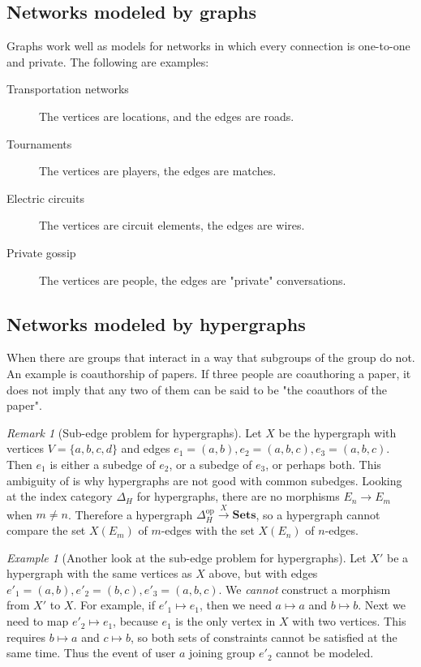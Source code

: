 \documentclass[10pt]{article}
\newcommand{\onearrow}[3]{\mbox{$#1 \stackrel{#2}{\longrightarrow} #3$}}
\newcommand{\mapto}[2]{\mbox{$#1 \mapsto #2$}}
\theoremstyle{remark}
\newtheorem{remark}{Remark}
\newtheorem{example}{Example}
\begin{document}
\subsection{Networks modeled by graphs}

Graphs work well as models for networks in which every connection is one-to-one and private. The following are examples:
\begin{description}
\item [Transportation networks] The vertices are locations, and the edges are roads.
\item [Tournaments] The vertices are players, the edges are matches.
\item [Electric circuits] The vertices are circuit elements, the edges are wires.
\item [Private gossip] The vertices are people, the edges are "private" conversations.
\end{description}

\subsection{Networks modeled by hypergraphs}

When there are groups that interact in a way that subgroups of the group do not. An example is coauthorship of papers. If three people are coauthoring a paper, it does not imply that any two of them can be said to be "the coauthors of the paper".

\begin{remark}[Sub-edge problem for hypergraphs]
Let $X$ be the hypergraph with vertices $V = \{a, b, c, d\}$ and edges $e_1 = (a,b), e_2 = (a,b,c), e_3 = (a,b,c)$.
Then $e_1$ is either a subedge of $e_2$, or a subedge of $e_3$, or perhaps both. This ambiguity of is why hypergraphs are not good with common subedges. Looking at the index category $\Delta_H$ for hypergraphs,
there are no morphisms \onearrow{E_n}{}{E_m} when $m \neq n$. Therefore a hypergraph \onearrow{\Delta_H^{\text{op}}}{X}{\mathbf{Sets}}, so a hypergraph cannot compare the set $X(E_m)$ of $m$-edges with the set $X(E_n)$ of $n$-edges.
\end{remark}

\begin{example}[Another look at the sub-edge problem for hypergraphs]
Let $X'$ be a hypergraph with the same vertices as $X$ above, but with edges $e'_1 = (a,b), e'_2 = (b,c), e'_3 = (a,b,c)$.
We \emph{cannot} construct a morphism from $X'$ to $X$. For example, if \mapto{e'_1}{e_1}, then we need \mapto{a}{a} and \mapto{b}{b}. Next we need to map \mapto{e'_2}{e_1}, because $e_1$ is the only vertex in $X$ with two vertices. This requires \mapto{b}{a} and \mapto{c}{b}, so both sets of constraints cannot be satisfied at the same time.
Thus the event of user $a$ joining group $e'_2$ cannot be modeled.
\end{example}
\end{document}
